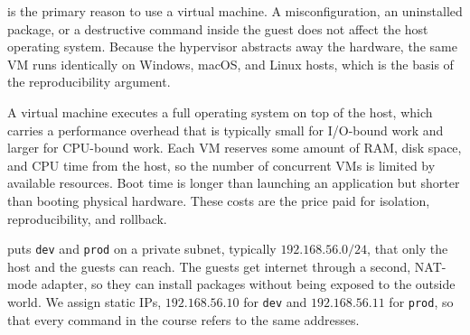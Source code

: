  is the primary reason to use a virtual machine.
A misconfiguration, an uninstalled package, or a destructive command inside the guest
does not affect the host operating system.
Because the hypervisor abstracts away the hardware, the same VM runs identically on Windows, macOS, and Linux hosts,
which is the basis of the reproducibility argument.


A virtual machine executes a full operating system on top of the host,
which carries a performance overhead that is typically small for I/O-bound work and larger for CPU-bound work.
Each VM reserves some amount of RAM, disk space, and CPU time from the host,
so the number of concurrent VMs is limited by available resources.
Boot time is longer than launching an application but shorter than booting physical hardware.
These costs are the price paid for isolation, reproducibility, and rollback.


 puts \texttt{dev} and \texttt{prod} on a private subnet,
typically $192.168.56.0/24$, that only the host and the guests can reach.
The guests get internet through a second, NAT-mode adapter,
so they can install packages without being exposed to the outside world.
We assign static IPs, $192.168.56.10$ for \texttt{dev} and $192.168.56.11$ for \texttt{prod},
so that every command in the course refers to the same addresses.











\newpage
